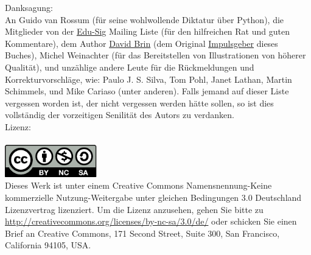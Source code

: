 \noindent
Danksagung:\\
An Guido van Rossum (für seine wohlwollende Diktatur über Python), die Mitglieder von der \href{http://www.python.org/community/sigs/current/edu-sig/}{Edu-Sig} Mailing Liste (für den hilfreichen Rat und guten Kommentare), dem Author \href{http://www.davidbrin.com/}{David Brin} (dem Original \href{http://www.salon.com/tech/feature/2006/09/14/basic/}{Impulsgeber} dieses Buches), Michel Weinachter (für das Bereitstellen von Illustrationen von höherer Qualität), und unzählige andere Leute für die Rückmeldungen und Korrekturvorschläge, wie: Paulo J. S. Silva, Tom Pohl, Janet Lathan, Martin Schimmels, und Mike Cariaso (unter anderen).  Falls jemand auf dieser Liste vergessen worden ist, der nicht vergessen werden hätte sollen, so ist dies vollständig der vorzeitigen Senilität des Autors zu verdanken.\\
\noindent
Lizenz:\\
\\
\includegraphics[width=40mm]{images/by-nc-sa}\\
Dieses Werk ist unter einem Creative Commons Namensnennung-Keine kommerzielle Nutzung-Weitergabe unter gleichen Bedingungen 3.0 Deutschland Lizenzvertrag lizenziert. Um die Lizenz anzusehen, gehen Sie bitte zu \\
\href{http://creativecommons.org/licenses/by-nc-sa/3.0/de/}{http://creativecommons.org/licenses/by-nc-sa/3.0/de/} oder schicken Sie einen Brief an Creative Commons, 171 Second Street, Suite 300, San Francisco, California 94105, USA.

